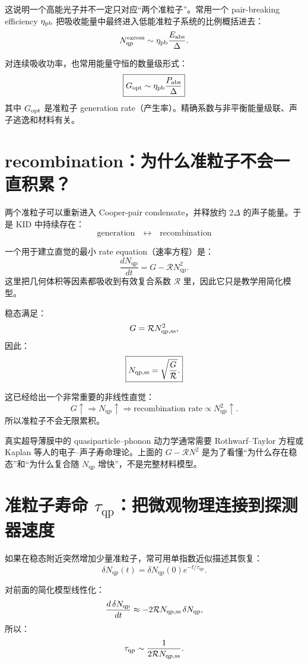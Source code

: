 \documentclass[11pt,a4paper,openany]{ctexrep}
\newcommand{\qp}{\mathrm{qp}}
\begin{document}
这说明一个高能光子并不一定只对应“两个准粒子”。常用一个 pair-breaking efficiency $\eta_{\rm pb}$ 把吸收能量中最终进入低能准粒子系统的比例概括进去：
\[
N_{\qp}^{\rm excess}
\sim
\eta_{\rm pb}\frac{E_{\rm abs}}{\Delta}.
\]

对连续吸收功率，也常用能量守恒的数量级形式：
\[
\boxed{
G_{\rm opt}
\sim
\eta_{\rm pb}\frac{P_{\rm abs}}{\Delta}
}
\]
其中 $G_{\rm opt}$ 是准粒子 generation rate（产生率）。精确系数与非平衡能量级联、声子逃逸和材料有关。

\section{recombination：为什么准粒子不会一直积累？}

两个准粒子可以重新进入 Cooper-pair condensate，并释放约 $2\Delta$ 的声子能量。于是 KID 中持续存在：
\[
\boxed{\text{generation}\quad\leftrightarrow\quad\text{recombination}}
\]

一个用于建立直觉的最小 rate equation（速率方程）是：
\[
\boxed{
\frac{dN_{\qp}}{dt}
=
G-\mathcal{R}N_{\qp}^2.
}
\]
这里把几何体积等因素都吸收到有效复合系数 $\mathcal{R}$ 里，因此它只是教学用简化模型。

稳态满足：
\[
G=\mathcal{R}N_{\qp,\rm ss}^2,
\]
因此：
\[
\boxed{
N_{\qp,\rm ss}
=
\sqrt{\frac{G}{\mathcal{R}}}.
}
\]

这已经给出一个非常重要的非线性直觉：
\[
G\uparrow
\Rightarrow
N_{\qp}\uparrow
\Rightarrow
\text{recombination rate}\propto N_{\qp}^2\uparrow.
\]
所以准粒子不会无限累积。

\begin{mistakebox}
真实超导薄膜中的 quasiparticle--phonon 动力学通常需要 Rothwarf--Taylor 方程或 Kaplan 等人的电子--声子寿命理论。上面的 $G-\mathcal{R}N^2$ 是为了看懂“为什么存在稳态”和“为什么复合随 $N_{\qp}$ 增快”，不是完整材料模型。
\end{mistakebox}

\section{准粒子寿命 $\tau_{\qp}$：把微观物理连接到探测器速度}

如果在稳态附近突然增加少量准粒子，常可用单指数近似描述其恢复：
\[
\boxed{
\delta N_{\qp}(t)
=
\delta N_{\qp}(0)e^{-t/\tau_{\qp}}.
}
\]

对前面的简化模型线性化：
\[
\frac{d\,\delta N_{\qp}}{dt}
\approx
-2\mathcal{R}N_{\qp,\rm ss}\,\delta N_{\qp},
\]
所以：
\[
\tau_{\qp}
\sim
\frac{1}{2\mathcal{R}N_{\qp,\rm ss}}.
\]
\end{document}

